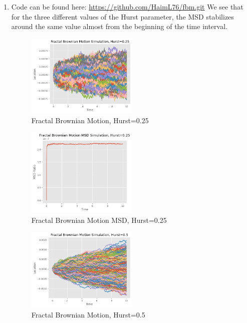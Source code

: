 \documentclass{article}
\begin{document}
\begin{enumerate}
\item Code can be found here: \url{https://github.com/HaimL76/fbm.git}
We see that for the three different values of the Hurst parameter, the MSD stabilizes around the same value almost from the beginning of the time interval.
\begin{figure}[h]
\caption{Fractal Brownian Motion, Hurst=0.25}
\centering
\includegraphics[width=0.5\textwidth]{fractal_brownian_motion_simulation_0.25.png}
\end{figure}
\begin{figure}[h]
\caption{Fractal Brownian Motion MSD, Hurst=0.25}
\centering
\includegraphics[width=0.5\textwidth]{fbm_msd_0.25.png}
\end{figure}
\begin{figure}[h]
\caption{Fractal Brownian Motion, Hurst=0.5}
\centering
\includegraphics[width=0.5\textwidth]{fractal_brownian_motion_simulation_0.5.png}
\end{figure}
\begin{figure}[h]

\end{figure}
\end{enumerate}
\end{document}
